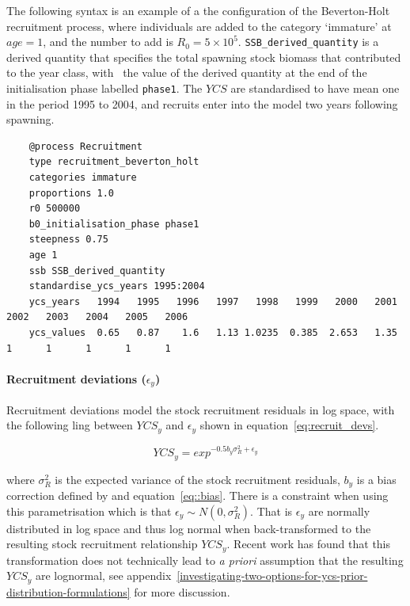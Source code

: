The following syntax is an example of a the configuration of the Beverton-Holt recruitment process, where individuals are added to the category `immature' at $age=1$, and the number to add is $R_0=5 \times 10^5$. \texttt{SSB\_derived\_quantity} is a derived quantity that specifies the total spawning stock biomass that contributed to the year class, with \Bzero\ the value of the derived quantity at the end of the initialisation phase labelled \texttt{phase1}. The $YCS$ are standardised to have mean one in the period 1995 to 2004, and recruits enter into the model two years following spawning.

{\small{\begin{verbatim}
	@process Recruitment
	type recruitment_beverton_holt
	categories immature
	proportions 1.0
	r0 500000
	b0_initialisation_phase phase1
	steepness 0.75
	age 1
	ssb SSB_derived_quantity
	standardise_ycs_years 1995:2004
	ycs_years   1994   1995   1996   1997   1998   1999   2000   2001   2002   2003   2004   2005   2006
	ycs_values  0.65   0.87    1.6   1.13 1.0235  0.385  2.653   1.35      1      1      1      1      1
\end{verbatim}}}


\paragraph*{Recruitment deviations ($\epsilon_y$)}

Recruitment deviations model the stock recruitment residuals in log space, with the following ling between $YCS_y$ and $\epsilon_y$ shown in equation~\ref{eq:recruit_devs}.

\begin{equation}\label{eq:recruit_devs}
	YCS_y = exp^{-0.5b_y\sigma^2_R + \epsilon_y}
\end{equation}

where $\sigma^2_R$ is the expected variance of the stock recruitment residuals, $b_y$ is a bias correction defined by \cite{methot2011adjusting} and equation~\ref{eq::bias}. There is a constraint when using this parametrisation which is that $\epsilon_y\sim N(0,\sigma^2_R)$. That is $\epsilon_y$ are normally distributed in log space and thus log normal when back-transformed to the resulting stock recruitment relationship $YCS_y$. Recent work has found that this transformation does not technically lead to \textit{a priori} assumption that the resulting $YCS_y$ are lognormal, see appendix~\ref{investigating-two-options-for-ycs-prior-distribution-formulations} for more discussion.

